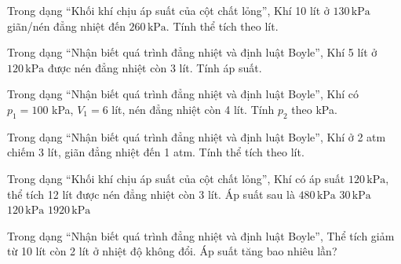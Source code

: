 \begin{ex}
Trong dạng “Khối khí chịu áp suất của cột chất lỏng”, Khí 10 lít ở $130\,\text{kPa}$ giãn/nén đẳng nhiệt đến $260\,\text{kPa}$. Tính thể tích theo lít.
\end{ex}

\begin{bt}
Trong dạng “Nhận biết quá trình đẳng nhiệt và định luật Boyle”, Khí 5 lít ở $120\,\text{kPa}$ được nén đẳng nhiệt còn 3 lít. Tính áp suất.
\end{bt}

\begin{ex}
Trong dạng “Nhận biết quá trình đẳng nhiệt và định luật Boyle”, Khí có $p_1=100$ kPa, $V_1=6$ lít, nén đẳng nhiệt còn 4 lít. Tính $p_2$ theo kPa.
\end{ex}

\begin{ex}
Trong dạng “Nhận biết quá trình đẳng nhiệt và định luật Boyle”, Khí ở 2 atm chiếm 3 lít, giãn đẳng nhiệt đến 1 atm. Tính thể tích theo lít.
\end{ex}

\begin{ex}
Trong dạng “Khối khí chịu áp suất của cột chất lỏng”, Khí có áp suất $120\,\text{kPa}$, thể tích 12 lít được nén đẳng nhiệt còn 3 lít. Áp suất sau là
\choice
{\True $480\,\text{kPa}$}
{$30\,\text{kPa}$}
{$120\,\text{kPa}$}
{$1920\,\text{kPa}$}
\end{ex}

\begin{ex}
Trong dạng “Nhận biết quá trình đẳng nhiệt và định luật Boyle”, Thể tích giảm từ 10 lít còn 2 lít ở nhiệt độ không đổi. Áp suất tăng bao nhiêu lần?
\end{ex}

